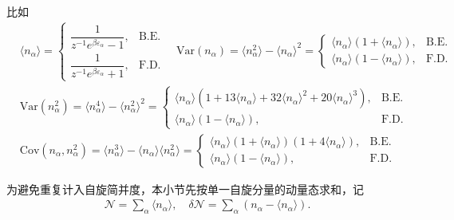 比如
\begin{align*}
	&\langle n_{\alpha} \rangle =
	\begin{cases}
		\dfrac{1}{z^{-1} e^{\beta \varepsilon_{\alpha}} - 1}, & \text{B.E.} \\[8pt]
		\dfrac{1}{z^{-1} e^{\beta \varepsilon_{\alpha}} + 1}, & \text{F.D.}
	\end{cases}\quad\mathrm{Var}(n_{\alpha}) = \langle n_{\alpha}^{2} \rangle - \langle n_{\alpha} \rangle^{2} =
	\begin{cases}
		\langle n_{\alpha} \rangle (1 + \langle n_{\alpha} \rangle), & \text{B.E.} \\
		\langle n_{\alpha} \rangle (1 - \langle n_{\alpha} \rangle), & \text{F.D.}
	\end{cases}\\
	&\mathrm{Var}(n_{\alpha}^{2}) = \langle n_{\alpha}^{4} \rangle - \langle n_{\alpha}^{2} \rangle^{2} =
	\begin{cases}
		\langle n_{\alpha} \rangle \left( 1 + 13 \langle n_{\alpha} \rangle + 32 \langle n_{\alpha} \rangle^{2} + 20 \langle n_{\alpha} \rangle^{3} \right), & \text{B.E.} \\
		\langle n_{\alpha} \rangle (1 - \langle n_{\alpha} \rangle),                                                                                         & \text{F.D.}
	\end{cases}\\
	&\mathrm{Cov}(n_{\alpha}, n_{\alpha}^{2}) = \langle n_{\alpha}^{3} \rangle - \langle n_{\alpha} \rangle \langle n_{\alpha}^{2} \rangle =
	\begin{cases}
		\langle n_{\alpha} \rangle (1 + \langle n_{\alpha} \rangle) (1 + 4 \langle n_{\alpha} \rangle), & \text{B.E.} \\
		\langle n_{\alpha} \rangle (1 - \langle n_{\alpha} \rangle),                                    & \text{F.D.}
	\end{cases}
\end{align*}

为避免重复计入自旋简并度，本小节先按单一自旋分量的动量态求和，记
\begin{align*}
	\mathcal{N} = \sum_{\alpha} \langle n_{\alpha} \rangle, \quad \delta \mathcal{N} = \sum_{\alpha} \left( n_{\alpha} - \langle n_{\alpha} \rangle \right).
\end{align*}

